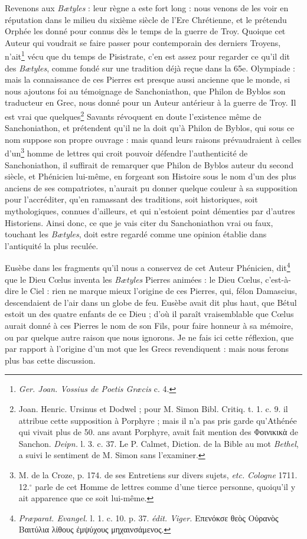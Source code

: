 \documentclass[a4paper, 11pt, oneside, polutonikogreek, french, landscape]{article}
\begin{document}
Revenons aux \emph{Bætyles} : leur règne a este fort long : nous venons de les voir en réputation dans le milieu du sixième siècle de l'Ere Chrétienne, et le prétendu Orphée les donné pour connus dès le temps de la guerre de Troy. Quoique cet Auteur qui voudrait se faire passer pour contemporain des derniers Troyens, n'ait\footnote{\emph{Ger. Joan. Vossius de Poetis Græcis} c. 4.} vécu que du temps de Pisistrate, c'en est assez pour regarder ce qu'il dit des \emph{Bætyles}, comme fondé sur une tradition déjà reçue dans la 65e. Olympiade : mais la connaissance de ces Pierres est presque aussi ancienne que le monde, si nous ajoutons foi au témoignage de Sanchoniathon, que Philon de Byblos son traducteur en Grec, nous donné pour un Auteur antérieur à la guerre de Troy. Il est vrai que quelques\footnote{Joan. Henric. Ursinus et Dodwel ; pour M. Simon Bibl. Critiq. t. 1. c. 9. il attribue cette supposition à Porphyre ; mais il n'a pas pris garde qu'Athénée qui vivait plus de 50. ans avant Porphyre, avait fait mention des Φοινικικὰ de Sanchon. \emph{Deipn.} l. 3. c. 37. Le P. Calmet, Diction. de la Bible au mot \emph{Bethel}, a suivi le sentiment de M. Simon sans l'examiner.} Savants révoquent en doute l'existence même de Sanchoniathon, et prétendent qu'il ne la doit qu'à Philon de Byblos, qui sous ce nom suppose son propre ouvrage : mais quand leurs raisons prévaudraient à celles d'un\footnote{M. de la Croze, p. 174. de ses Entretiens sur divers sujets, \emph{etc.} \emph{Cologne} 1711. 12.$^\circ$ parle de cet Homme de lettres comme d'une tierce personne, quoiqu’il y ait apparence que ce soit lui-même.} homme de lettres qui croit pouvoir défendre l'authenticité de Sanchoniathon, il suffirait de remarquer que Philon de Byblos auteur du second siècle, et Phénicien lui-même, en forgeant son Histoire sous le nom d'un des plus anciens de ses compatriotes, n'aurait pu donner quelque couleur à sa supposition pour l'accréditer, qu'en ramassant des traditions, soit historiques, soit mythologiques, connues d'ailleurs, et qui n'estoient point démenties par d'autres Historiens. Ainsi donc, ce que je vais citer du Sanchoniathon vrai ou faux, touchant les \emph{Bætyles}, doit estre regardé comme une opinion établie dans l'antiquité la plus reculée.

Eusèbe dans les fragments qu'il nous a conservez de cet Auteur Phénicien, dit\footnote{\emph{Præparat. Evangel.} l. 1. c. 10. p. 37. \emph{édit. Viger.} Επενόκσε θεὸς Οὑρανὸς Βαιτύλια λίθους ἐμψύχους μηχαινσάμενος.} que le Dieu Cœlus inventa les \emph{Bætyles} Pierres animées : le Dieu Cœlus, c'est-à-dire le Ciel : rien ne marque mieux l'origine de ces Pierres, qui, félon Damascius, descendaient de l'air dans un globe de feu. Eusèbe avait dit plus haut, que Bétul estoit un des quatre enfants de ce Dieu ; d'où il paraît vraisemblable que Cœlus aurait donné à ces Pierres le nom de son Fils, pour faire honneur à sa mémoire, ou par quelque autre raison que nous ignorons. Je ne fais ici cette réflexion, que par rapport à l'origine d'un mot que les Grecs revendiquent : mais nous ferons plus bas cette discussion.
\end{document}
